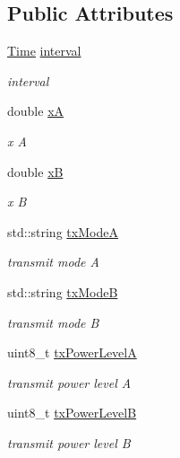 \subsection*{Public Attributes}
\begin{DoxyCompactItemize}
\item 
\hyperlink{classns3_1_1Time}{Time} \hyperlink{structCollisionExperiment_1_1Input_a0cdb6cdbddfc779012c3a493344d00ad}{interval}
\begin{DoxyCompactList}\small\item\em interval \end{DoxyCompactList}\item 
double \hyperlink{structCollisionExperiment_1_1Input_a62fb772dc1b9dd7564ec0436afaf77f1}{xA}
\begin{DoxyCompactList}\small\item\em x A \end{DoxyCompactList}\item 
double \hyperlink{structCollisionExperiment_1_1Input_a077d4ed496d30c5c298c570566ea592a}{xB}
\begin{DoxyCompactList}\small\item\em x B \end{DoxyCompactList}\item 
std\+::string \hyperlink{structCollisionExperiment_1_1Input_a68c8bb4425d443eaab3ae2a8f3a476ff}{tx\+ModeA}
\begin{DoxyCompactList}\small\item\em transmit mode A \end{DoxyCompactList}\item 
std\+::string \hyperlink{structCollisionExperiment_1_1Input_ae702c9a6f996817fed879b1c01c9afc5}{tx\+ModeB}
\begin{DoxyCompactList}\small\item\em transmit mode B \end{DoxyCompactList}\item 
uint8\+\_\+t \hyperlink{structCollisionExperiment_1_1Input_ac1c7cf8c05bcdf00b9d23c429b39ee7f}{tx\+Power\+LevelA}
\begin{DoxyCompactList}\small\item\em transmit power level A \end{DoxyCompactList}\item 
uint8\+\_\+t \hyperlink{structCollisionExperiment_1_1Input_a1e42b824a7acbea5e22bb14c6a1c18c8}{tx\+Power\+LevelB}
\begin{DoxyCompactList}\small\item\em transmit power level B \end{DoxyCompactList}\item 

\end{DoxyCompactItemize}
